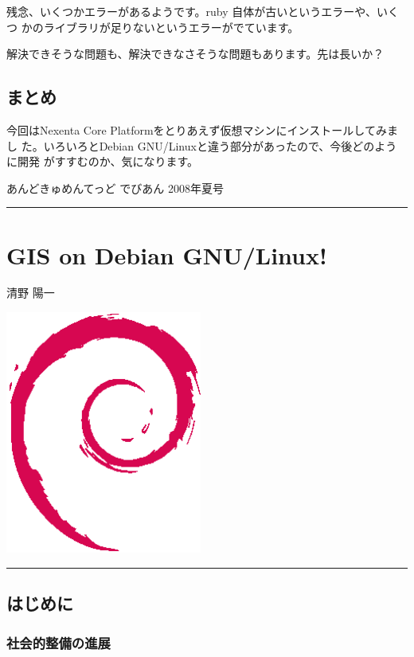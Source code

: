 \documentclass[mingoth,a4paper]{jsarticle}
\renewcommand{\dancersection}[2]{%
\newpage
あんどきゅめんてっど でびあん 2008年夏号
%
\vspace{0.1mm}\\
{\color{dancerlightblue}\rule{\hsize}{2mm}}

%
%
\begin{minipage}[t]{0.6\hsize}
\color{dancerdarkblue}
\vspace{1cm}
\section{#1}
\hfill{}#2\\
\end{minipage}
\begin{minipage}[t]{0.4\hsize}
\vspace{-2cm}
\hfill{}\includegraphics[height=8cm]{image200502/openlogo-nd.eps}\\
\vspace{-5cm}
\end{minipage}
%
%
{\color{dancerdarkblue}\rule{0.74\hsize}{2mm}}
%
\vspace{2cm}
}
\begin{document}
残念、いくつかエラーがあるようです。ruby 自体が古いというエラーや、いくつ
かのライブラリが足りないというエラーがでています。

解決できそうな問題も、解決できなさそうな問題もあります。先は長いか？

\subsection{まとめ}

今回はNexenta Core Platformをとりあえず仮想マシンにインストールしてみまし
た。いろいろとDebian GNU/Linuxと違う部分があったので、今後どのように開発
がすすむのか、気になります。





\dancersection{GIS on Debian GNU/Linux!}{清野 陽一}


\subsection{はじめに}
\subsubsection{社会的整備の進展}
\end{document}
